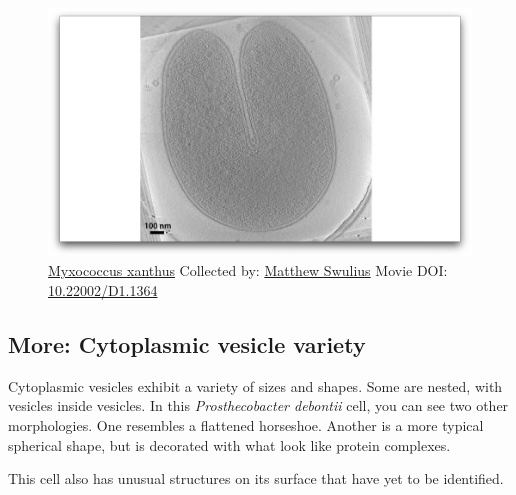\documentclass[]{tufte-book}
\begin{document}
\begin{figure}
\includegraphics{movie_stills/2_4c} \caption[\protect\hyperlink{tree}{Myxococcus xanthus} Collected by:
\protect\hyperlink{matthew_swulius}{Matthew Swulius} Movie DOI:
\href{https://doi.org/10.22002/D1.1364}{10.22002/D1.1364}]{\protect\hyperlink{tree}{Myxococcus xanthus} Collected by:
\protect\hyperlink{matthew_swulius}{Matthew Swulius} Movie DOI:
\href{https://doi.org/10.22002/D1.1364}{10.22002/D1.1364}}\label{fig:2-4c}
\end{figure}

\hypertarget{Cytoplasmic_vesicle_variety}{\subsection*{More: Cytoplasmic
vesicle variety}\label{Cytoplasmic_vesicle_variety}}

Cytoplasmic vesicles exhibit a variety of sizes and shapes. Some are
nested, with vesicles inside vesicles. In this \emph{Prosthecobacter
debontii} cell, you can see two other morphologies. One resembles a
flattened horseshoe. Another is a more typical spherical shape, but is
decorated with what look like protein complexes.

This cell also has unusual structures on its surface that have yet to be
identified.
\end{document}
